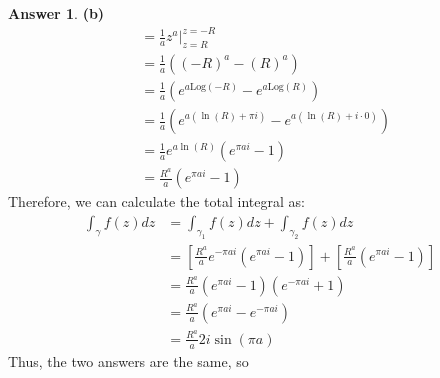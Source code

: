 \documentclass[10pt,a4paper]{article}
\theoremstyle{definition}
\newtheorem*{answer*}{Answer}
\begin{document}
\begin{answer*}{\textbf{(b)}}
\begin{align*}
&= \frac{1}{a}z^a \Big|_{z = R}^{z = -R}\\
&= \frac{1}{a}\left((-R)^a - (R)^a\right)\\
&= \frac{1}{a}\left(e^{a\text{Log}(-R)} - e^{a\text{Log}(R)}\right)\\
&= \frac{1}{a}\left(e^{a(\ln(R) + \pi i)} - e^{a(\ln(R) + i \cdot 0)}\right)\\
&= \frac{1}{a}e^{a\ln(R)}\left(e^{\pi ai} - 1\right)\\
&= \frac{R^a}{a}\left(e^{\pi ai} - 1\right)
\end{align*}
Therefore, we can calculate the total integral as:
\begin{align*}
\int_{\gamma} f(z)dz &= \int_{\gamma_1}f(z)dz + \int_{\gamma_2}f(z)dz\\
&= \left[\frac{R^a}{a}e^{-\pi ai}\left(e^{\pi ai} - 1\right)\right] + \left[\frac{R^a}{a}\left(e^{\pi ai} - 1\right)\right]\\
&= \frac{R^a}{a}\left(e^{\pi ai} - 1\right)\left(e^{-\pi ai} + 1\right)\\
&= \frac{R^a}{a}\left(e^{\pi a i} - e^{-\pi ai}\right)\\
&= \frac{R^a}{a}2i\sin(\pi a)
\end{align*}
Thus, the two answers are the same, so 
\end{answer*}
\end{document}
